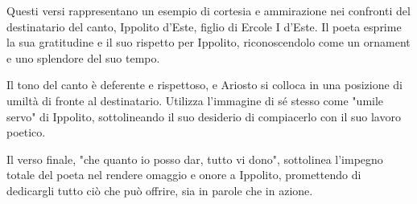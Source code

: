 \documentclass[a4paper]{article}
\begin{document}
\begin{center}
\begin{minipage}{0.5\textwidth}
\centering
{}
\end{minipage}
\end{center}

Questi versi rappresentano un esempio di cortesia e
ammirazione nei confronti del destinatario del canto,
Ippolito d'Este, figlio di Ercole I d'Este.
Il poeta esprime la sua gratitudine e il suo rispetto
per Ippolito, riconoscendolo come un ornament
e uno splendore del suo tempo.

Il tono del canto è deferente e rispettoso,
e Ariosto si colloca in una posizione di umiltà di
fronte al destinatario.
Utilizza l'immagine di sé stesso come "umile servo" di Ippolito,
sottolineando il suo desiderio di compiacerlo con
il suo lavoro poetico.

Il verso finale, "che quanto io posso dar, tutto vi dono",
sottolinea l'impegno totale del poeta nel rendere omaggio
e onore a Ippolito, promettendo di dedicargli tutto
ciò che può offrire, sia in parole che in azione.

\begin{center}
\begin{minipage}{0.5\textwidth}
\centering
{}
\end{minipage}
\end{center}
\end{document}
